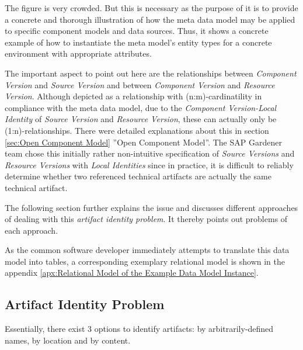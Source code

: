 The figure is very crowded. But this is necessary as the purpose of it is to provide a concrete and thorough illustration of how the meta data model may be applied to specific component models and data sources. Thus, it shows a concrete example of how to instantiate the meta model's entity types for a concrete environment with appropriate attributes.\par
The important aspect to point out here are the relationships between \emph{Component Version} and  \emph{Source Version} and between \emph{Component Version} and \emph{Resource Version}. Although depicted as a relationship with (n:m)-cardinatility in compliance with the meta data model, due to the \emph{Component Version-Local Identity} of \emph{Source Version} and \emph{Resource Version}, these can actually only be (1:n)-relationships. There were detailed explanations about this in section \ref{sec:Open Component Model} ''Open Component Model''. The SAP Gardener team chose this initially rather non-intuitive specification of \emph{Source Versions} and \emph{Resource Versions} with \emph{Local Identities} since in practice, it is difficult to reliably determine whether two referenced technical artifacts are actually the same technical artifact.\par 
The following section further explains the issue and discusses different approaches of dealing with this \emph{artifact identity problem}. It thereby points out problems of each approach.\par
As the common software developer immediately attempts to translate this data model into tables, a corresponding exemplary relational model is shown in the appendix \ref{apx:Relational Model of the Example Data Model Instance}.  

\subsection{Artifact Identity Problem}
Essentially, there exist 3 options to identify artifacts: by arbitrarily-defined names, by location and by content.\\

